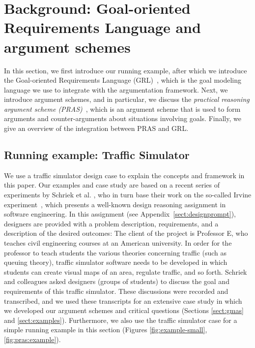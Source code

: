 \section{Background: Goal-oriented Requirements Language and argument schemes}
\label{sect:background}

In this section, we first introduce our running example, after which we introduce the Goal-oriented Requirements Language (GRL)~\cite{Amyot:2010:EGM:1841349.1841356}, which is the goal modeling language we use to integrate with the argumentation framework. Next, we introduce argument schemes, and in particular, we discuss the \emph{practical reasoning argument scheme (PRAS)}~\cite{atkinson2007}, which is an argument scheme that is used to form arguments and counter-arguments about situations involving goals. Finally, we give an overview of the integration between PRAS and GRL.  %

\subsection{Running example: Traffic Simulator}
\label{sect:goals:runningexample}

We use a traffic simulator design case to explain the concepts and framework in this paper. Our examples and case study are based on a recent series of experiments by Schriek et al. \cite{SchriekEtal2016}, who in turn base their work on the so-called Irvine experiment~\cite{UCIworkshop}, which presents a well-known design reasoning assignment in software engineering. In this assignment (see Appendix~\ref{sect:designprompt}), designers are provided with a problem description, requirements, and a description of the desired outcomes: The client of the project is Professor E, who teaches civil engineering courses at an American university. In order for the professor to teach students the various theories concerning traffic (such as queuing theory), traffic simulator software needs to be developed in which students can create visual maps of an area, regulate traffic, and so forth. Schriek and colleagues asked designers (groups of students) to discuss the goal and requirements of this traffic simulator. These discussions were recorded and transcribed, and we used these transcripts for an extensive case study in which we developed our argument schemes and critical questions (Sections \ref{sect:gmas} and \ref{sect:examples}). Furthermore, we also use the traffic simulator case for a simple  running example in this section (Figures \ref{fig:example-small}, \ref{fig:pras:example}). 

